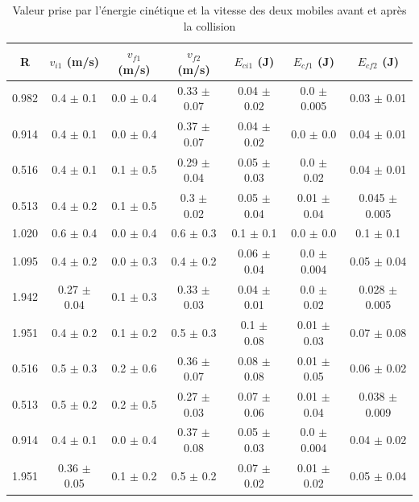 \documentclass[12pt]{article}
\begin{document}
\begin{table}[h!]
    \begin{center}
        \begin{tabular}{|c|c|c|c|c|c|c|}
            \hline
            R & $v_{i1}$ (m/s) & $v_{f1}$ (m/s) & $v_{f2}$ (m/s) & $E_{ci1}$ (J) & $E_{cf1}$ (J) & $E_{cf2}$ (J) \\ \hline
            0.982 & 0.4 $\pm$ 0.1 & 0.0 $\pm$ 0.4 & 0.33 $\pm$ 0.07 & 0.04 $\pm$ 0.02 & 0.0 $\pm$ 0.005 & 0.03 $\pm$ 0.01 \\ 
            0.914 & 0.4 $\pm$ 0.1 & 0.0 $\pm$ 0.4 & 0.37 $\pm$ 0.07 & 0.04 $\pm$ 0.02 & 0.0 $\pm$ 0.0 & 0.04 $\pm$ 0.01 \\ 
            0.516 & 0.4 $\pm$ 0.1 & 0.1 $\pm$ 0.5 & 0.29 $\pm$ 0.04 & 0.05 $\pm$ 0.03 & 0.0 $\pm$ 0.02 & 0.04 $\pm$ 0.01 \\ 
            0.513 & 0.4 $\pm$ 0.2 & 0.1 $\pm$ 0.5 & 0.3 $\pm$ 0.02 & 0.05 $\pm$ 0.04 & 0.01 $\pm$ 0.04 & 0.045 $\pm$ 0.005 \\ 
            1.020 & 0.6 $\pm$ 0.4 & 0.0 $\pm$ 0.4 & 0.6 $\pm$ 0.3 & 0.1 $\pm$ 0.1 & 0.0 $\pm$ 0.0 & 0.1 $\pm$ 0.1 \\ 
            1.095 & 0.4 $\pm$ 0.2 & 0.0 $\pm$ 0.3 & 0.4 $\pm$ 0.2 & 0.06 $\pm$ 0.04 & 0.0 $\pm$ 0.004 & 0.05 $\pm$ 0.04 \\ 
            1.942 & 0.27 $\pm$ 0.04 & 0.1 $\pm$ 0.3 & 0.33 $\pm$ 0.03 & 0.04 $\pm$ 0.01 & 0.0 $\pm$ 0.02 & 0.028 $\pm$ 0.005 \\ 
            1.951 & 0.4 $\pm$ 0.2 & 0.1 $\pm$ 0.2 & 0.5 $\pm$ 0.3 & 0.1 $\pm$ 0.08 & 0.01 $\pm$ 0.03 & 0.07 $\pm$ 0.08 \\ 
            0.516 & 0.5 $\pm$ 0.3 & 0.2 $\pm$ 0.6 & 0.36 $\pm$ 0.07 & 0.08 $\pm$ 0.08 & 0.01 $\pm$ 0.05 & 0.06 $\pm$ 0.02 \\ 
            0.513 & 0.5 $\pm$ 0.2 & 0.2 $\pm$ 0.5 & 0.27 $\pm$ 0.03 & 0.07 $\pm$ 0.06 & 0.01 $\pm$ 0.04 & 0.038 $\pm$ 0.009 \\ 
            0.914 & 0.4 $\pm$ 0.1 & 0.0 $\pm$ 0.4 & 0.37 $\pm$ 0.08 & 0.05 $\pm$ 0.03 & 0.0 $\pm$ 0.004 & 0.04 $\pm$ 0.02 \\ 
            1.951 & 0.36 $\pm$ 0.05 & 0.1 $\pm$ 0.2 & 0.5 $\pm$ 0.2 & 0.07 $\pm$ 0.02 & 0.01 $\pm$ 0.02 & 0.05 $\pm$ 0.04 \\ 
            \hline
        \end{tabular}
    \end{center}
	\caption{Valeur prise par l'énergie cinétique et la vitesse des deux mobiles avant et après la collision}
\end{table}
\end{document}
